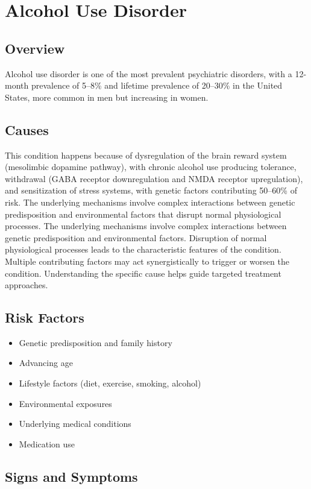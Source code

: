 \chapter{Alcohol Use Disorder}
\label{sec:Alcohol Use Disorder}

\section{Overview}
Alcohol use disorder is one of the most prevalent psychiatric disorders, with a 12-month prevalence of 5--8\% and lifetime prevalence of 20--30\% in the United States, more common in men but increasing in women.
\section{Causes}
This condition happens because of dysregulation of the brain reward system (mesolimbic dopamine pathway), with chronic alcohol use producing tolerance, withdrawal (GABA receptor downregulation and NMDA receptor upregulation), and sensitization of stress systems, with genetic factors contributing 50--60\% of risk. The underlying mechanisms involve complex interactions between genetic predisposition and environmental factors that disrupt normal physiological processes. The underlying mechanisms involve complex interactions between genetic predisposition and environmental factors. Disruption of normal physiological processes leads to the characteristic features of the condition. Multiple contributing factors may act synergistically to trigger or worsen the condition. Understanding the specific cause helps guide targeted treatment approaches.
\section{Risk Factors}


\begin{itemize}[noitemsep]
  \item Genetic predisposition and family history
  \item Advancing age
  \item Lifestyle factors (diet, exercise, smoking, alcohol)
  \item Environmental exposures
  \item Underlying medical conditions
  \item Medication use
\end{itemize}
\section{Signs and Symptoms}

